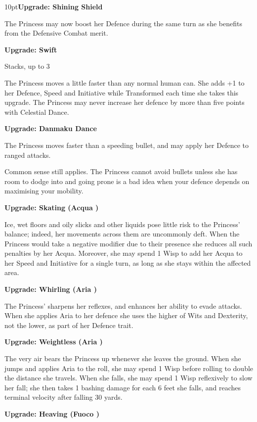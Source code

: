 \begin{myindentpar}{10pt}\textbf{Upgrade: Shining Shield}

The Princess may now boost her Defence during the same turn as she benefits from the Defensive Combat merit. 

\textbf{Upgrade: Swift}

Stacks, up to 3

The Princess moves a little faster than any normal human can. She adds +1 to her Defence, Speed and Initiative while Transformed each time she takes this upgrade. The Princess may never increase her defence by more than five points with Celestial Dance. 

\textbf{Upgrade: Danmaku Dance}

The Princess moves faster than a speeding bullet, and may apply her Defence to ranged attacks.

Common sense still applies. The Princess cannot avoid bullets unless she has room to dodge into and going prone is a bad idea when your defence depends on maximising your mobility. 

\textbf{Upgrade: Skating (Acqua \textbullet)}

Ice, wet floors and oily slicks and other liquids pose little risk to the Princess' balance; indeed, her movements across them are uncommonly deft. When the Princess would take a negative modifier due to their presence she reduces all such penalties by her Acqua. Moreover, she may spend 1 Wisp to add her Acqua to her Speed and Initiative for a single turn, as long as she stays within the affected area.

\textbf{Upgrade: Whirling (Aria \textbullet)}

The Princess' sharpens her reflexes, and enhances her ability to evade attacks. When she applies Aria to her defence she uses the higher of Wits and Dexterity, not the lower, as part of her Defence trait. 

\textbf{Upgrade: Weightless (Aria \textbullet\textbullet)}

The very air bears the Princess up whenever she leaves the ground. When she jumps and applies Aria to the roll, she may spend 1 Wisp before rolling to double the distance she travels. When she falls, she may spend 1 Wisp reflexively to slow her fall; she then takes 1 bashing damage for each 6 feet she falls, and reaches terminal velocity after falling 30 yards.

\textbf{Upgrade: Heaving (Fuoco \textbullet\textbullet)}


\end{myindentpar}
